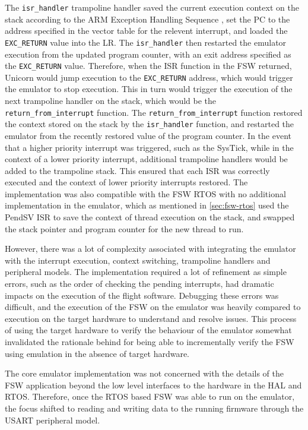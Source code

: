 \documentclass[../report.tex]{subfiles}
\begin{document}
The \lstinline|isr_handler| trampoline handler saved the current execution
context on the stack according to the ARM Exception Handling Sequence
\citep{ARM_Exception}, set the PC to the address specified in the vector table
for the relevent interrupt, and loaded the \lstinline|EXC_RETURN| value into
the LR. The \lstinline|isr_handler| then restarted the emulator execution from
the updated program counter, with an exit address specified as the
\lstinline|EXC_RETURN| value. Therefore, when the ISR function in the FSW
returned, Unicorn would jump execution to the \lstinline|EXC_RETURN| address,
which would trigger the emulator to stop execution. This in turn would trigger
the execution of the next trampoline handler on the stack, which would be the
\lstinline|return_from_interrupt| function. The
\lstinline|return_from_interrupt| function restored the context stored on the
stack by the \lstinline|isr_handler| function, and restarted the emulator from
the recently restored value of the program counter. In the event that a higher
priority interrupt was triggered, such as the SysTick, while in the context of
a lower priority interrupt, additional trampoline handlers would be added to
the trampoline stack. This ensured that each ISR was correctly executed and the
context of lower priority interrupts restored. The implementation was also
compatible with the FSW RTOS with no additional implementation in the emulator,
which as mentioned in \autoref{sec:fsw-rtos} used the PendSV ISR to save the
context of thread execution on the stack, and swapped the stack pointer and
program counter for the new thread to run.

However, there was a lot of complexity associated with integrating the emulator
with the interrupt execution, context switching, trampoline handlers and
peripheral models. The implementation required a lot of refinement as simple
errors, such as the order of checking the pending interrupts, had dramatic
impacts on the execution of the flight software. Debugging these errors was
difficult, and the execution of the FSW on the emulator was heavily compared to
execution on the target hardware to understand and resolve issues. This process
of using the target hardware to verify the behaviour of the emulator somewhat
invalidated the rationale behind  for being able to incrementally
verify the FSW using emulation in the absence of target hardware.

The core emulator implementation was not concerned with the details of the FSW
application beyond the low level interfaces to the hardware in the HAL and
RTOS. Therefore, once the RTOS based FSW was able to run on the emulator, the
focus shifted to reading and writing data to the running firmware through the
USART peripheral model.
\end{document}
